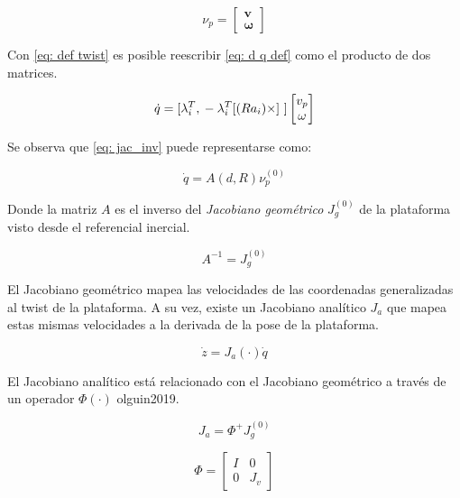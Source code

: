 \begin{equation}\label{eq: def twist}
 \nu_p = \begin{bmatrix}
        \mathbf v \\
        \boldsymbol \omega
       \end{bmatrix}
\end{equation}

Con \eqref{eq: def twist} es posible 
reescribir \eqref{eq: d q def} como el producto de dos 
matrices.

\begin{equation} \label{eq: jac_inv}
\dot{q} = [\lambda_i^T, \\ -\lambda_i^T [(Ra_i)\times]\ ] \begin{bmatrix}
v_p\\
\omega
\end{bmatrix}
\end{equation}

Se observa que \ref{eq: jac_inv} puede 
representarse como:

\begin{equation} \label{eq: jac_g}
\dot{q} = A(d,R) \nu_p^{(0)}
\end{equation}

Donde la matriz $A$ es el inverso del 
\emph{Jacobiano geométrico} 
$J_g^{(0)}$ de la plataforma 
visto desde el referencial inercial. 

\begin{equation}
 A^{-1} = J_g^{(0)}
\end{equation}



El Jacobiano geométrico mapea las velocidades 
de las coordenadas generalizadas al twist de 
la plataforma.
A su vez, existe un Jacobiano analítico $J_a$ que mapea
estas mismas velocidades a la derivada de la pose
de la plataforma.

\begin{equation} \label{eq: jac_a}
\dot{z} = J_a(\cdot)\dot{q}
\end{equation}

El Jacobiano analítico está relacionado con el Jacobiano
geométrico a través de un operador $\Phi(\cdot)$ {olguin2019}.

\begin{equation}\label{eq: jacobian conversion}
 J_a = \Phi^{+} J_g^{(0)}
\end{equation}

\begin{equation}
 \Phi = \begin{bmatrix}
         I & 0\\
         0 & J_v
        \end{bmatrix}
\end{equation}

